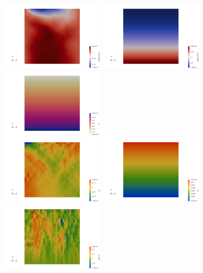 \begin{center}
\includegraphics[width=5cm]{python_codes/fieldstone_34/results/exp3/u}
\includegraphics[width=5cm]{python_codes/fieldstone_34/results/exp3/v}
\includegraphics[width=5cm]{python_codes/fieldstone_34/results/exp3/p}\\
\includegraphics[width=5cm]{python_codes/fieldstone_34/results/exp3/exx}
\includegraphics[width=5cm]{python_codes/fieldstone_34/results/exp3/eyy}
\includegraphics[width=5cm]{python_codes/fieldstone_34/results/exp3/exy}
\end{center}

